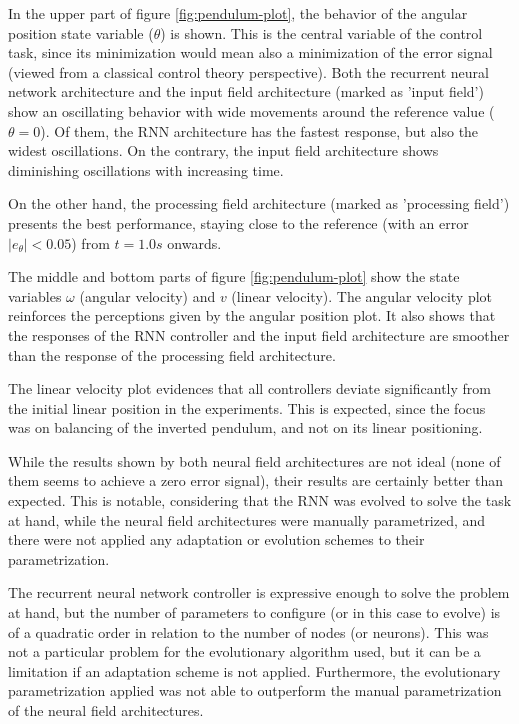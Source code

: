 In the upper part of figure \ref{fig:pendulum-plot}, the behavior of
the angular position state variable ($\theta$) is shown. This is the
central variable of the control task, since its minimization would
mean also a minimization of the error signal (viewed from a classical
control theory perspective). Both the recurrent neural network
architecture and the input field architecture (marked as 'input
field') show an oscillating behavior with wide movements around the
reference value ($\theta=0$). Of them, the RNN architecture has the
fastest response, but also the widest oscillations. On the contrary,
the input field architecture shows diminishing oscillations with
increasing time.

On the other hand, the processing field architecture (marked as
'processing field') presents the best performance, staying close to
the reference (with an error $|e_{\theta}|<0.05$) from $t=1.0s$
onwards.

The middle and bottom parts of figure \ref{fig:pendulum-plot} show the
state variables $\omega$ (angular velocity) and $v$ (linear
velocity). The angular velocity plot reinforces the perceptions given
by the angular position plot. It also shows that the responses of the
RNN controller and the input field architecture are smoother than the
response of the processing field architecture.

The linear velocity plot evidences that all controllers deviate
significantly from the initial linear position in the
experiments. This is expected, since the focus was on balancing of the
inverted pendulum, and not on its linear positioning.

While the results shown by both neural field architectures are not
ideal (none of them seems to achieve a zero error signal), their
results are certainly better than expected. This is notable,
considering that the RNN was evolved to solve the task at hand, while
the neural field architectures were manually parametrized, and there
were not applied any adaptation or evolution schemes to their
parametrization.

The recurrent neural network controller is expressive enough to solve
the problem at hand, but the number of parameters to configure (or in
this case to evolve) is of a quadratic order in relation to the number
of nodes (or neurons). This was not a particular problem for the
evolutionary algorithm used, but it can be a limitation if an
adaptation scheme is not applied. Furthermore, the evolutionary
parametrization applied was not able to outperform the manual
parametrization of the neural field architectures.

